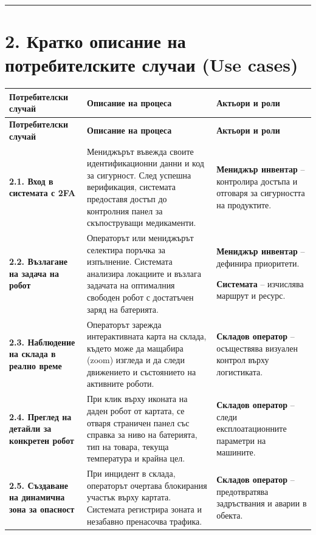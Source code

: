 \documentclass[12pt, a4paper]{article}
\begin{document}
\rule{\textwidth}{0.4pt}

\section*{2. Кратко описание на потребителските случаи (Use cases)}

\noindent
\begin{xltabular}{\textwidth}{|>{\RaggedRight\arraybackslash}p{4cm}|>{\RaggedRight\arraybackslash}X|>{\RaggedRight\arraybackslash}X|}
\hline
\textbf{Потребителски случай} & \textbf{Описание на процеса} & \textbf{Актьори и роли} \\ \hline
\endfirsthead

\hline
\textbf{Потребителски случай} & \textbf{Описание на процеса} & \textbf{Актьори и роли} \\ \hline
\endhead

\textbf{2.1. Вход в системата с 2FA} & Мениджърът въвежда своите идентификационни данни и код за сигурност. След успешна верификация, системата предоставя достъп до контролния панел за скъпоструващи медикаменти. & \textbf{Мениджър инвентар} – контролира достъпа и отговаря за сигурността на продуктите. \\ \hline

\textbf{2.2. Възлагане на задача на робот} & Операторът или мениджърът селектира поръчка за изпълнение. Системата анализира локациите и възлага задачата на оптималния свободен робот с достатъчен заряд на батерията. & \textbf{Мениджър инвентар} – дефинира приоритети.\par\medskip \textbf{Системата} – изчислява маршрут и ресурс. \\ \hline

\textbf{2.3. Наблюдение на склада в реално време} & Операторът зарежда интерактивната карта на склада, където може да мащабира (zoom) изгледа и да следи движението и състоянието на активните роботи. & \textbf{Складов оператор} – осъществява визуален контрол върху логистиката. \\ \hline

\textbf{2.4. Преглед на детайли за конкретен робот} & При клик върху иконата на даден робот от картата, се отваря страничен панел със справка за ниво на батерията, тип на товара, текуща температура и крайна цел. & \textbf{Складов оператор} – следи експлоатационните параметри на машините. \\ \hline

\textbf{2.5. Създаване на динамична зона за опасност} & При инцидент в склада, операторът очертава блокирания участък върху картата. Системата регистрира зоната и незабавно пренасочва трафика. & \textbf{Складов оператор} – предотвратява задръствания и аварии в обекта. \\ \hline


\end{xltabular}
\end{document}
